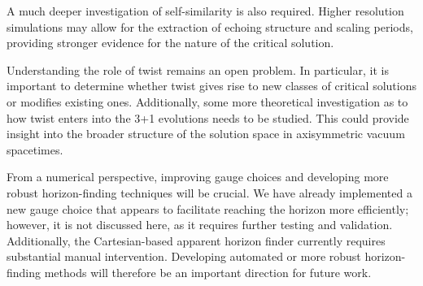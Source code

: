 A much deeper investigation of self-similarity is also required. Higher resolution simulations may allow for the extraction of echoing structure and scaling periods, providing stronger evidence for the nature of the critical solution.

Understanding the role of twist remains an open problem. In particular, it is important to determine whether twist gives rise to new classes of critical solutions or modifies existing ones. Additionally, some more theoretical investigation as to how twist enters into the 3+1 evolutions needs to be studied. This could provide insight into the broader structure of the solution space in axisymmetric vacuum spacetimes.

From a numerical perspective, improving gauge choices and developing more robust horizon-finding techniques will be crucial. We have already implemented a new gauge choice that appears to facilitate reaching the horizon more efficiently; however, it is not discussed here, as it requires further testing and validation. 
Additionally, the Cartesian-based apparent horizon finder currently requires substantial manual intervention. Developing automated or more robust horizon-finding methods will therefore be an important direction for future work.


